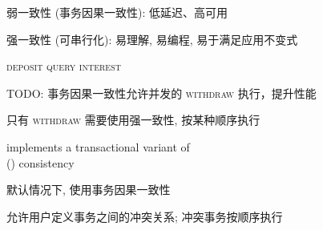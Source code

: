 \begin{frame}{}
  \begin{center}
    弱一致性 (事务因果一致性): 低延迟、高可用


    强一致性 (可串行化): 易理解, 易编程, 易于满足应用不变式
  \end{center}
\end{frame}

\begin{frame}{}
  \begin{center}
    \textsc{deposit \quad {} \quad query \quad interest}

    \pause
    \vspace{0.60cm}
    TODO: 事务因果一致性允许并发的 \textsc{withdraw} 执行，提升性能

    \pause
    \vspace{0.30cm}
    只有 \textsc{withdraw} 需要使用强一致性, 按某种顺序执行
  \end{center}
\end{frame}

\begin{frame}{}
  \begin{center}
    \unistore{} implements a transactional variant of \\
     (\por) consistency~\purple{
      \footnotesize [Li@ACT'2018]}

    \vspace{0.80cm}
    \begin{description}[(II)]
      \setlength{\itemsep}{8pt}
      \item[(I)] 默认情况下, 使用事务因果一致性
      \item[(II)] 允许用户定义事务之间的冲突关系; 冲突事务按顺序执行
    \end{description}
  \end{center}
\end{frame}

